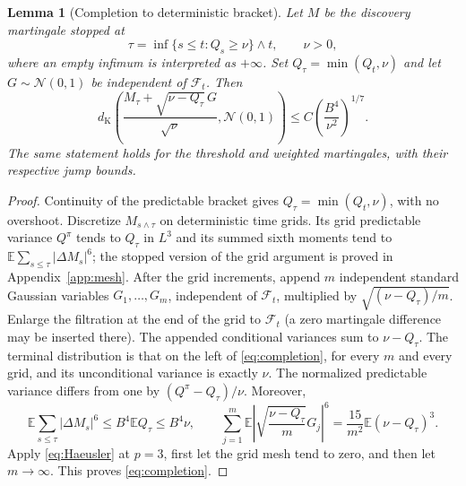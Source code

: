 \documentclass[11pt]{article}
\numberwithin{equation}{section}
\newtheorem{lemma}[theorem]{Lemma}
\theoremstyle{definition}
\theoremstyle{remark}
\newcommand{\E}{\mathbb E}
\newcommand{\dK}{d_{\mathrm K}}
\newcommand{\Normal}{\mathcal N(0,1)}
\begin{document}
\begin{lemma}[Completion to deterministic bracket]\label{lem:completion}
Let $M$ be the discovery martingale stopped at
\[
 \tau=\inf\{s\le t:Q_s\ge\nu\}\wedge t,
 \qquad \nu>0,
\]
where an empty infimum is interpreted as $+\infty$. Set
$Q_\tau=\min(Q_t,\nu)$ and let $G\sim\Normal$ be independent of
$\mathcal F_t$. Then
\begin{equation}\label{eq:completion}
 \dK\left(\frac{M_\tau+\sqrt{\nu-Q_\tau}\,G}{\sqrt\nu},\Normal\right)
 \le C\left(\frac{B^4}{\nu^2}\right)^{1/7}.
\end{equation}
The same statement holds for the threshold and weighted martingales, with
their respective jump bounds.
\end{lemma}
\begin{proof}
Continuity of the predictable bracket gives $Q_\tau=\min(Q_t,\nu)$,
with no overshoot. Discretize $M_{s\wedge\tau}$ on deterministic time grids.
Its grid predictable variance $Q^\pi$ tends to $Q_\tau$ in $L^3$ and its
summed sixth moments tend to $\E\sum_{s\le\tau}|\Delta M_s|^6$; the stopped
version of the grid argument is proved in Appendix~\ref{app:mesh}.
After the grid increments, append $m$ independent standard Gaussian variables
$G_1,\ldots,G_m$, independent of $\mathcal F_t$, multiplied by
$\sqrt{(\nu-Q_\tau)/m}$. Enlarge the filtration at the end of the grid to
$\mathcal F_t$ (a zero martingale difference may be inserted there).
The appended conditional variances sum to $\nu-Q_\tau$.
The terminal distribution is that on the left of \eqref{eq:completion}, for
every $m$ and every grid, and its unconditional variance is exactly $\nu$.
The normalized predictable variance differs from one by
$(Q^\pi-Q_\tau)/\nu$. Moreover,
\[
 \E\sum_{s\le\tau}|\Delta M_s|^6\le B^4\E Q_\tau\le B^4\nu,
 \qquad
 \sum_{j=1}^m\E\left|\sqrt{\frac{\nu-Q_\tau}{m}}G_j\right|^6
 =\frac{15}{m^2}\E(\nu-Q_\tau)^3.
\]
Apply \eqref{eq:Haeusler} at $p=3$, first let the grid mesh tend to zero,
and then let $m\to\infty$. This proves \eqref{eq:completion}.
\end{proof}
\end{document}

